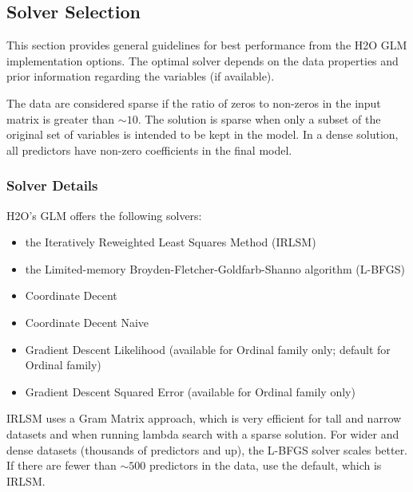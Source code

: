 \newpage
\subsection{Solver Selection}

This section provides general guidelines for best performance from the H2O GLM implementation options. The optimal solver depends on the data properties and prior information regarding the variables (if available). 

The data are considered sparse if the ratio of zeros to non-zeros in the input matrix is greater than $\sim 10$. The solution is sparse when only a subset of the original set of variables is intended to be kept in the model. In a dense solution, all predictors have non-zero coefficients in the final model.  

\subsubsection{Solver Details}
H2O's GLM offers the following solvers: 

\begin{itemize}
\item the Iteratively Reweighted Least Squares Method (IRLSM)
\item the Limited-memory Broyden-Fletcher-Goldfarb-Shanno algorithm (L-BFGS)
\item Coordinate Decent
\item Coordinate Decent Naive
\item Gradient Descent Likelihood (available for Ordinal family only; default for Ordinal family)
\item Gradient Descent Squared Error (available for Ordinal family only)
\end{itemize}

IRLSM uses a Gram Matrix approach, which is very efficient for tall and narrow datasets and when running lambda search with a sparse solution.  For wider and dense datasets (thousands of predictors and up), the L-BFGS solver scales better. If there are fewer than $\sim 500$ predictors in the data, use the default, which is IRLSM. 

